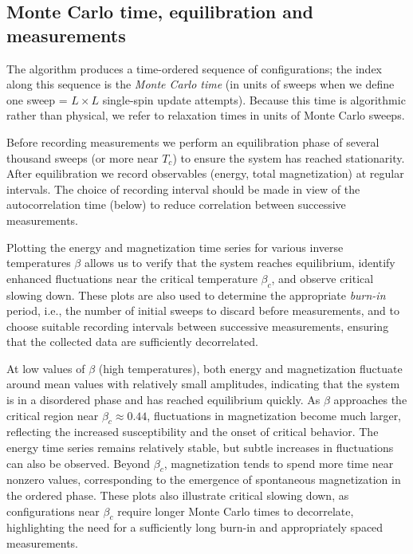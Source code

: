 \subsection{Monte Carlo time, equilibration and measurements}

The algorithm produces a time-ordered sequence of configurations; the index
along this sequence is the \emph{Monte Carlo time} (in units of sweeps when we
define one sweep = \(L\times L\) single-spin update attempts). Because this
time is algorithmic rather than physical, we refer to relaxation times in
units of Monte Carlo sweeps.

Before recording measurements we perform an equilibration phase of several
thousand sweeps (or more near \(T_c\)) to ensure the system has reached
stationarity. After equilibration we record observables (energy, total
magnetization) at regular intervals. The choice of recording interval should
be made in view of the autocorrelation time (below) to reduce correlation
between successive measurements.


Plotting the energy and magnetization time series for various inverse temperatures $\beta$ allows us to verify that the system reaches equilibrium, identify enhanced fluctuations near the critical temperature $\beta_c$, and observe critical slowing down. These plots are also used to determine the appropriate \emph{burn-in} period, i.e., the number of initial sweeps to discard before measurements, and to choose suitable recording intervals between successive measurements, ensuring that the collected data are sufficiently decorrelated.






At low values of $\beta$ (high temperatures), both energy and magnetization fluctuate around mean values with relatively small amplitudes, indicating that the system is in a disordered phase and has reached equilibrium quickly. As $\beta$ approaches the critical region near $\beta_c \approx 0.44$, fluctuations in magnetization become much larger, reflecting the increased susceptibility and the onset of critical behavior. The energy time series remains relatively stable, but subtle increases in fluctuations can also be observed. Beyond $\beta_c$, magnetization tends to spend more time near nonzero values, corresponding to the emergence of spontaneous magnetization in the ordered phase. These plots also illustrate critical slowing down, as configurations near $\beta_c$ require longer Monte Carlo times to decorrelate, highlighting the need for a sufficiently long burn-in and appropriately spaced measurements.


